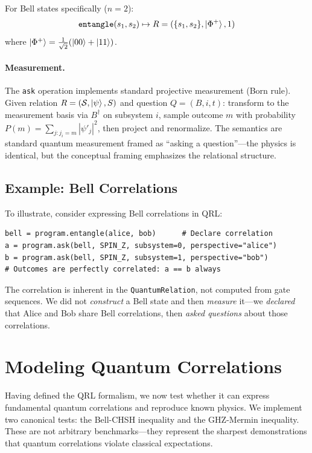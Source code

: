 \documentclass[submission,copyright,creativecommons]{eptcs}
\newcommand{\qrl}{\textsc{QRL}}
\begin{document}
For Bell states specifically ($n = 2$):
\begin{equation}
\texttt{entangle}(s_1, s_2) \mapsto R = (\{s_1, s_2\}, \ket{\Phi^+}, 1)
\end{equation}
where $\ket{\Phi^+} = \frac{1}{\sqrt{2}}(\ket{00} + \ket{11})$.

\paragraph{Measurement.}
The \texttt{ask} operation implements standard projective measurement
(Born rule). Given relation $R = (\mathcal{S}, \ket{\psi}, S)$ and
question $Q = (B, i, t)$: transform to the measurement basis via
$B^\dagger$ on subsystem $i$, sample outcome $m$ with probability
$P(m) = \sum_{j: j_i = m} |\psi'_j|^2$, then project and renormalize.
The semantics are standard quantum measurement framed as ``asking a
question''---the physics is identical, but the conceptual framing
emphasizes the relational structure.

\subsection{Example: Bell Correlations}

To illustrate, consider expressing Bell correlations in \qrl{}:

\begin{lstlisting}
bell = program.entangle(alice, bob)      # Declare correlation
a = program.ask(bell, SPIN_Z, subsystem=0, perspective="alice")
b = program.ask(bell, SPIN_Z, subsystem=1, perspective="bob")
# Outcomes are perfectly correlated: a == b always
\end{lstlisting}

The correlation is inherent in the \texttt{QuantumRelation}, not computed
from gate sequences. We did not \emph{construct} a Bell state and then
\emph{measure} it---we \emph{declared} that Alice and Bob share Bell
correlations, then \emph{asked questions} about those correlations.


\section{Modeling Quantum Correlations}
\label{sec:correlations}

Having defined the \qrl{} formalism, we now test whether it can express
fundamental quantum correlations and reproduce known physics. We implement
two canonical tests: the Bell-CHSH inequality and the GHZ-Mermin inequality.
These are not arbitrary benchmarks---they represent the sharpest demonstrations
that quantum correlations violate classical expectations.
\end{document}
